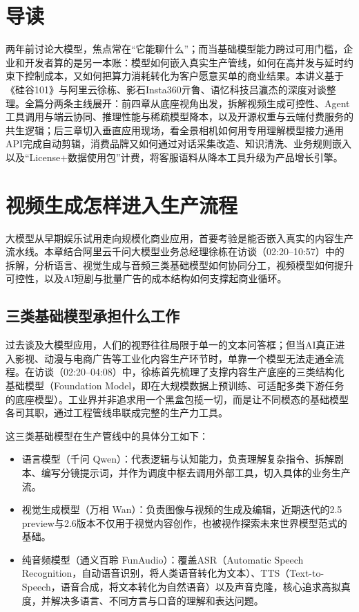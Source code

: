 \documentclass[UTF8,a4paper,11pt,fontset=fandol]{ctexart}
\begin{document}
\section*{导读}
两年前讨论大模型，焦点常在“它能聊什么”；而当基础模型能力跨过可用门槛，企业和开发者算的是另一本账：模型如何嵌入真实生产管线，如何在高并发与延时约束下控制成本，又如何把算力消耗转化为客户愿意买单的商业结果。本讲义基于《硅谷101》与阿里云徐栋、影石Insta360亓鲁、语忆科技吕瀛杰的深度对谈整理。全篇分两条主线展开：前四章从底座视角出发，拆解视频生成可控性、Agent工具调用与端云协同、推理性能与稀疏模型降本，以及开源权重与云端付费服务的共生逻辑；后三章切入垂直应用现场，看全景相机如何用专用理解模型接力通用API完成自动剪辑，消费品牌又如何通过对话采集改造、知识清洗、业务规则嵌入以及“License+数据使用包”计费，将客服语料从降本工具升级为产品增长引擎。
\section{视频生成怎样进入生产流程}
大模型从早期娱乐试用走向规模化商业应用，首要考验是能否嵌入真实的内容生产流水线。本章结合阿里云千问大模型业务总经理徐栋在访谈（02:20–10:57）中的拆解，分析语言、视觉生成与音频三类基础模型如何协同分工，视频模型如何提升可控性，以及AI短剧与批量广告的成本结构如何支撑起商业循环。
\subsection{三类基础模型承担什么工作}
过去谈及大模型应用，人们的视野往往局限于单一的文本问答框；但当AI真正进入影视、动漫与电商广告等工业化内容生产环节时，单靠一个模型无法走通全流程。在访谈（02:20–04:08）中，徐栋首先梳理了支撑内容生产底座的三类结构化基础模型（Foundation Model，即在大规模数据上预训练、可适配多类下游任务的底座模型）。工业界并非追求用一个黑盒包揽一切，而是让不同模态的基础模型各司其职，通过工程管线串联成完整的生产力工具。

这三类基础模型在生产管线中的具体分工如下：
\begin{itemize}
\item 语言模型（千问 Qwen）：代表逻辑与认知能力，负责理解复杂指令、拆解剧本、编写分镜提示词，并作为调度中枢去调用外部工具，切入具体的业务生产流。
\item 视觉生成模型（万相 Wan）：负责图像与视频的生成及编辑，近期迭代的2.5 preview与2.6版本不仅用于视觉内容创作，也被视作探索未来世界模型范式的基础。
\item 纯音频模型（通义百聆 FunAudio）：覆盖ASR（Automatic Speech Recognition，自动语音识别，将人类语音转化为文本）、TTS（Text-to-Speech，语音合成，将文本转化为自然语音）以及声音克隆，核心追求高拟真度，并解决多语言、不同方言与口音的理解和表达问题。
\end{itemize}
\end{document}
